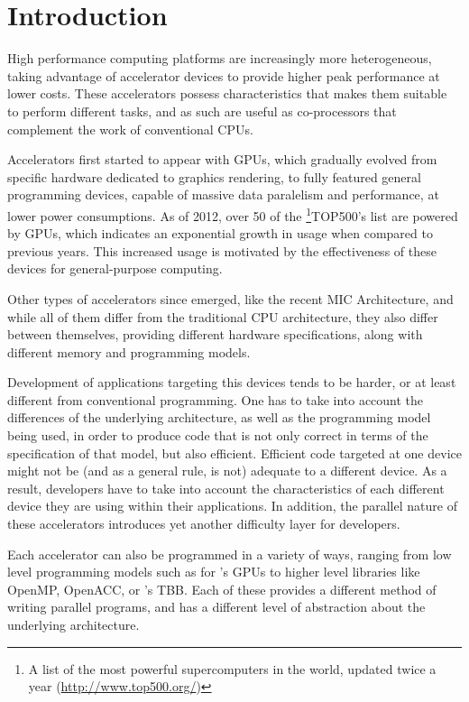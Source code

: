 \documentclass[main.tex]{subfiles}
\begin{document}
\chapter{Introduction}


High performance computing platforms are increasingly more heterogeneous, taking advantage of accelerator devices to provide higher peak performance at lower costs. These accelerators possess characteristics that makes them suitable to perform different tasks, and as such are useful as co-processors that complement the work of conventional \acp{CPU}.

Accelerators first started to appear with \acp{GPU}, which gradually evolved from specific hardware dedicated to graphics rendering, to fully featured general programming devices, capable of massive data paralelism and performance, at lower power consumptions. As of 2012, over 50 of the \footnote{A list of the most powerful supercomputers in the world, updated twice a year (\url{http://www.top500.org/})}{TOP500's} list are powered by \acp{GPU}, which indicates an exponential growth in usage when compared to previous years. This increased usage is motivated by the effectiveness of these devices for general-purpose computing. 

Other types of accelerators since emerged, like the recent \intel \ac{MIC} Architecture, and while all of them differ from the traditional \ac{CPU} architecture, they also differ between themselves, providing different hardware specifications, along with different memory and programming models. 

Development of applications targeting this devices tends to be harder, or at least different from conventional programming. One has to take into account the differences of the underlying architecture, as well as the programming model being used, in order to produce code that is not only correct in terms of the specification of that model, but also efficient. Efficient code targeted at one device might not be (and as a general rule, is not) adequate to a different device. As a result, developers have to take into account the characteristics of each different device they are using within their applications. In addition, the parallel nature of these accelerators introduces yet another difficulty layer for developers.

Each accelerator can also be programmed in a variety of ways, ranging from low level programming models such as \cuda for \nvidia's \acp{GPU} to higher level libraries like \acs{OpenMP}, \acs{OpenACC}, or \intel's \acs{TBB}. Each of these provides a different method of writing parallel programs, and has a different level of abstraction about the underlying architecture. 
\end{document}
